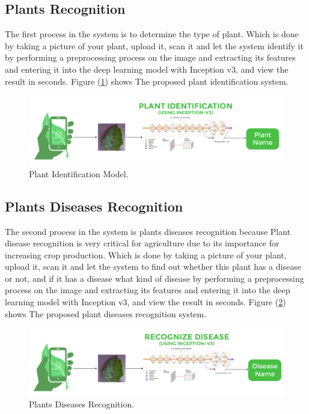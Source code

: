 \subsection{Plants Recognition}

The first process in the system is to determine the type of plant. 
Which is done by taking a picture of your plant, upload it, scan it 
and let the system identify it by performing a preprocessing process
on the image and extracting its features and entering it into the deep
learning model with Inception v3, and view the result in seconds.
Figure (\ref{fig:plantId}) shows The proposed plant identification system.
\begin{figure}[H]
    \centering
    \includegraphics[width=\textwidth]{photos/chapter04/6.png}
    \caption{Plant Identification Model.}
    \label{fig:plantId}
\end{figure}


\subsection{Plants Diseases Recognition}

The second process in the system is plants diseases recognition 
because Plant disease recognition is very critical for agriculture 
due to its importance for increasing crop production. Which is done 
by taking a picture of your plant, upload it, scan it and let the 
system to find out whether this plant has a disease or not, and if 
it has a disease what kind of disease by performing a preprocessing 
process on the image and extracting its features and entering it into 
the deep learning model with Inception v3, and view the result in seconds. 
Figure (\ref{fig:plantDis}) shows The proposed plant diseases recognition system.

\begin{figure}[H]
    \centering
    \includegraphics[width=\textwidth]{photos/chapter04/7.png}
    \caption{Plants Diseases Recognition.}
    \label{fig:plantDis}
\end{figure}


